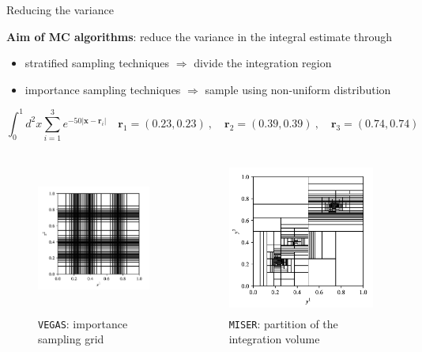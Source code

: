 \documentclass[t,handout,professionalfont,serif]{beamer}
\begin{document}
\begin{frame}{Reducing the variance}
	\scriptsize
	
	\textbf{Aim of MC algorithms}: reduce the variance in the integral estimate through
	\begin{itemize}
		\item stratified sampling techniques $\Rightarrow$ divide the integration region
		\item importance sampling techniques $\Rightarrow$ sample using non-uniform distribution
	\end{itemize}
	\tiny
			\begin{equation}
	\int_0^1 d^2 x \sum_{i=1}^3 e^{-50 |\textbf{x}- \textbf{r}_i|} \quad  \textbf{r}_1 = (0.23, 0.23)\ , \quad  \textbf{r}_2 = (0.39, 0.39)\ ,  \quad  	\textbf{r}_3 =(0.74, 0.74) 
\end{equation}
\vspace{-0.8cm}
	\begin{columns}
		\begin{column}{0.5\textwidth}
			\begin{figure}
				\includegraphics[height=5cm]{VEGAS.png}
				\caption{\texttt{VEGAS}: importance sampling grid}
			\end{figure}
			
		\end{column}
	\begin{column}{0.5\textwidth}
		\begin{figure}
			\includegraphics[height=5cm]{MISER.png}
			\caption{\texttt{MISER}:  partition of the integration volume}
		\end{figure}
	
		
	\end{column}
	\end{columns}

\end{frame}
\end{document}
